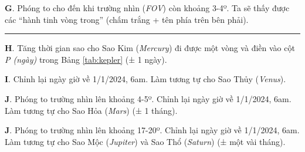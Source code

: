 \documentclass[
  a4paper,
]{book}
\begin{document}
\textbf{G}. Phóng to cho đến khi trường nhìn (\emph{FOV}) còn khoảng 3-4º. Ta sẽ thấy được các ``hành tinh vòng trong'' (chấm trắng + tên phía trên bên phải).

\begin{center}\rule{0.5\linewidth}{0.5pt}\end{center}

\textbf{H}. Tăng thời gian sao cho Sao Kim (\emph{Mercury}) đi được một vòng và điền vào cột \emph{P (ngày)} trong Bảng \ref{tab:kepler} (± 1 ngày).

\textbf{I}. Chỉnh lại ngày giờ về 1/1/2024, 6am. Làm tương tự cho Sao Thủy (\emph{Venus}).

\textbf{J}. Phóng to trường nhìn lên khoảng 4-5º. Chỉnh lại ngày giờ về 1/1/2024, 6am. Làm tương tự cho Sao Hỏa (\emph{Mars}) (± 1 tháng).

\textbf{J}. Phóng to trường nhìn lên khoảng 17-20º. Chỉnh lại ngày giờ về 1/1/2024, 6am. Làm tương tự cho Sao Mộc (\emph{Jupiter}) và Sao Thổ (\emph{Saturn}) (± một vài tháng).
\end{document}
